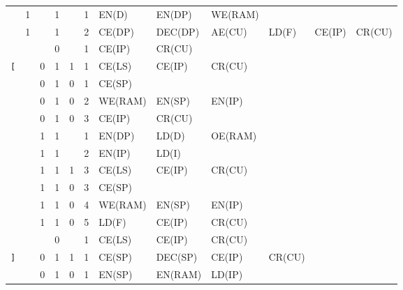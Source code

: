 \begin{landscape}
\begin{longtable}[c] {c|cccc|c|llllll}
    \rowcolor{Gray}               & 1 &   & 1     &      & 1     & EN(D)    & EN(DP)   & WE(RAM) &        &        &        \\
    \rowcolor{Gray}               & 1 &   & 1     &      & 2     & CE(DP)   & DEC(DP)  & AE(CU)  & LD(F)  & CE(IP) & CR(CU) \\
    \rowcolor{White}              &   &   & 0     &      & 1     & CE(IP)   & CR(CU)   &         &        &        &        \\ \hline
    \rowcolor{Gray}  \texttt{[}   &   & 0 & 1     & 1    & 1     & CE(LS)   & CE(IP)   & CR(CU)  &        &        &        \\
    \rowcolor{White}              &   & 0 & 1     & 0    & 1     & CE(SP)   &          &         &        &        &        \\
    \rowcolor{White}              &   & 0 & 1     & 0    & 2     & WE(RAM)  & EN(SP)   & EN(IP)  &        &        &        \\
    \rowcolor{White}              &   & 0 & 1     & 0    & 3     & CE(IP)   & CR(CU)   &         &        &        &        \\
    \rowcolor{Gray}               &   & 1 & 1     &      & 1     & EN(DP)   & LD(D)    & OE(RAM) &        &        &        \\
    \rowcolor{Gray}               &   & 1 & 1     &      & 2     & EN(IP)   & LD(I)    &         &        &        &        \\
    \rowcolor{Gray}               &   & 1 & 1     & 1    & 3     & CE(LS)   & CE(IP)   & CR(CU)  &        &        &        \\
    \rowcolor{White}              &   & 1 & 1     & 0    & 3     & CE(SP)   &          &         &        &        &        \\
    \rowcolor{White}              &   & 1 & 1     & 0    & 4     & WE(RAM)  & EN(SP)   & EN(IP)  &        &        &        \\
    \rowcolor{White}              &   & 1 & 1     & 0    & 5     & LD(F)    & CE(IP)   & CR(CU)  &        &        &        \\ 
    \rowcolor{Gray}               &   &   & 0     &      & 1     & CE(LS)   & CE(IP)   & CR(CU)  &        &        &        \\ \hline
    \rowcolor{White} \texttt{]}   &   & 0 & 1     & 1    & 1     & CE(SP)   & DEC(SP)  & CE(IP)  & CR(CU) &        &        \\
    \rowcolor{Gray}               &   & 0 & 1     & 0    & 1     & EN(SP)   & EN(RAM)  & LD(IP)  &        &        &        \\

\end{longtable}
\end{landscape}
